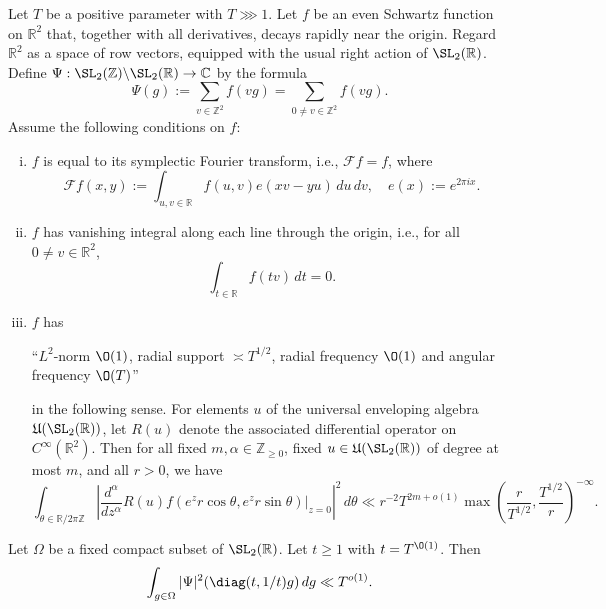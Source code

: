 \begin{theorem}\label{thm:sub-gln:let-f-be}
  Let $T$ be a positive parameter with $T \ggg 1$.  Let $f$ be an even Schwartz function on $\mathbb{R}^2$ that, together with all derivatives, decays rapidly near the origin.  Regard $\mathbb{R}^2$ as a space of row vectors, equipped with the usual right action of $\SL_2(\mathbb{R})$.  Define $\Psi : \SL_2(\mathbb{Z}) \backslash \SL_2(\mathbb{R}) \rightarrow \mathbb{C}$ by the formula
  \begin{equation*}
    \Psi(g) :=
    \sum_{v \in \mathbb{Z}^2} f(v g)
    =
    \sum_{0 \neq v \in \mathbb{Z}^2} f(v g).
  \end{equation*}
  Assume the following conditions on $f$:
  \begin{enumerate}[(i)]
  \item \label{itm:sketch-sl2-assump-1} $f$ is equal to its symplectic Fourier transform, i.e., $\mathcal{F} f = f$, where
    \begin{equation*}
      \mathcal{F} f(x,y) := \int_{u, v \in \mathbb{R} } f(u,v ) e(x v - y u) \, d u \, d v, \quad  e(x) := e^{2 \pi i x}.
    \end{equation*}
  \item \label{itm:sketch-sl2-assump-2} $f$ has vanishing integral along each line through the origin, i.e., for all $0 \neq v \in \mathbb{R}^2$,
    \begin{equation}\label{eq:int-_t-in-1}
      \int_{t \in \mathbb{R} } f( t v) \, d t = 0.
    \end{equation}
  \item \label{itm:sketch-sl2-assump-3} $f$  has
    \begin{center}
      ``$L^2$-norm $\O(1)$, radial support $\asymp T^{1/2}$, radial frequency $\O(1)$ and angular frequency $\O(T)$''
    \end{center}
    in the following sense.  For elements $u$ of the universal enveloping algebra $\mathfrak{U}(\SL_2(\mathbb{R}))$, let $R(u)$ denote the associated differential operator on $C^\infty(\mathbb{R}^2)$.  Then for all fixed $m, \alpha \in \mathbb{Z}_{\geq 0}$, fixed $u \in \mathfrak{U}(\SL_2(\mathbb{R}))$ of degree at most $m$, and all $r > 0$, we have
    \begin{equation}\label{eq:int-_v-in-7}
      \int_{\theta \in \mathbb{R} / 2 \pi \mathbb{Z} }
      \left\lvert
        \frac{d^\alpha }{d z^\alpha } R(u) f(e^{z} r \cos \theta, e^z r \sin \theta )|_{z=0}
      \right\rvert^2 \, d \theta  \ll r^{-2} T^{2 m + o(1)} \max \left( \frac{r}{T^{1/2}}, \frac{T^{1/2}}{r} \right)^{-\infty}.
    \end{equation}
  \end{enumerate}
  Let $\Omega$ be a fixed compact subset of $\SL_2(\mathbb{R})$.  Let $t \geq 1$ with $t = T^{\O(1)}$.  Then
  \begin{equation}\label{eq:int-_g-in-1}
    \int_{g \in \Omega } |\Psi|^2 (\diag(t, 1/t) g) \, d g
    \ll
    T^{o(1)}.
  \end{equation}
\end{theorem}

